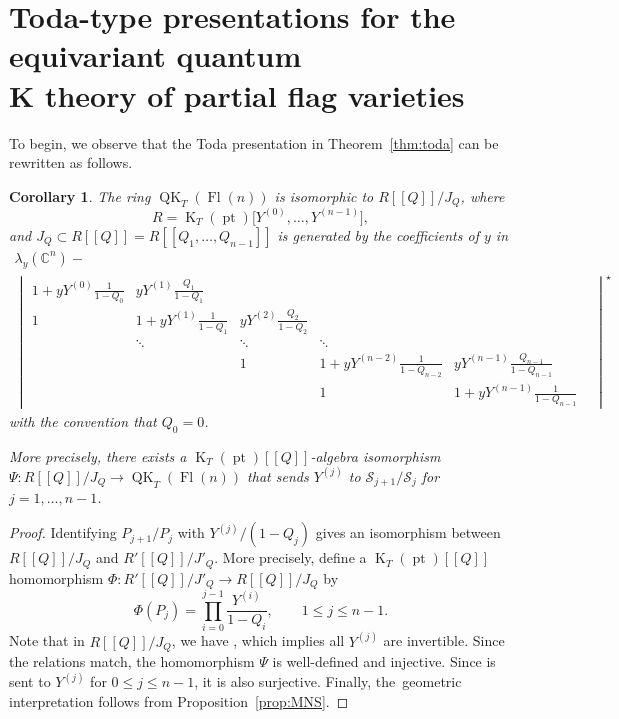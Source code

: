\documentclass[pdftex]{sigma}
\numberwithin{equation}{section}
\newtheorem{Corollary}[Theorem]{Corollary}
\theoremstyle{definition}
\newcommand{\dbb}[1]{[\![#1]\!]}
\DeclareMathOperator{\Fl}{Fl}
\DeclareMathOperator{\QK}{QK}
\DeclareMathOperator{\K}{K}
\DeclareMathOperator{\pt}{pt}
\newcommand{\C}{{\mathbb C}}
\newcommand{\cS}{{\mathcal S}}
\begin{document}
\section[Toda-type presentations for the equivariant quantum K theory of partial flag varieties]{Toda-type presentations for the equivariant quantum\\ K theory of partial flag varieties}%

To begin, we observe that the Toda presentation in Theorem~\ref{thm:toda} can be rewritten as follows.
\begin{Corollary}\label{cor:fln}
 The ring $\QK_T(\Fl(n))$ is isomorphic to $R\dbb{Q}/J_Q$, where
 \[
 R=\K_T(\pt)\bigl[Y^{(0)}, \dots, Y^{(n-1)}\bigr],
 \]
 and $J_Q\subset R\dbb{Q}=R\dbb{Q_1,\dots,Q_{n-1}}$ is generated by the coefficients of $y$ in
 \begin{gather*}%
 \lambda_y(\C^n) - \\
 \begin{vmatrix}
 1+yY^{(0)}\frac{1}{1-Q_0} & yY^{(1)}\frac{Q_1}{1-Q_1} & & & & \\[1mm]
 1 & 1+yY^{(1)}\frac{1}{1-Q_1} & yY^{(2)}\frac{Q_2}{1-Q_2} & & & \\ %
& \ddots & \ddots & \ddots \\ & & 1 & 1+yY^{(n-2)}\frac{1}{1-Q_{n-2}} & yY^{(n-1)}\frac{Q_{n-1}}{1-Q_{n-1}}\\[1mm] & & & 1 & 1+yY^{(n-1)}\frac{1}{1-Q_{n-1}}
\!\!\!\end{vmatrix}^\star
\end{gather*}
with the convention that $Q_0=0$.

More precisely,
there exists a $\K_T(\pt)[\![Q]\!]$-algebra isomorphism $\Psi\colon R[\![Q]\!]/J_Q \to \QK_T(\Fl(n))$ that sends $Y^{(j)}$ to $\cS_{j+1}/\cS_j$ for $j=1,\dots,n-1$.
\end{Corollary}
\begin{proof}
 Identifying $P_{j+1}/P_j$ with $Y^{(j)}/(1-Q_j)$ gives an isomorphism between $R[\![Q]\!]/J_Q$ and $R'[\![Q]\!]/J'_Q$. More precisely, define a $\K_T(\pt)[\![Q]\!]$ homomorphism $\Phi\colon R'[\![Q]\!]/J'_Q\to R[\![Q]\!]/J_Q$ by
\[
 \Phi(P_j)=\prod_{i=0}^{j-1}\frac{Y^{(i)}}{1-Q_i}, \qquad 1\leq j\leq n-1.
\]
Note that in $R[\![Q]\!]/J_Q$, we have \smash{$\det\C^{n}=\prod_{i=0}^{n-1}Y^{(i)}/(1-Q_i)$}, which implies all $Y^{(j)}$ are invertible. Since the relations match, the homomorphism $\Psi$ is well-defined and injective. Since  is sent to $Y^{(j)}$ for $0\leq j\leq n-1$, it is also surjective. Finally, the~geometric interpretation follows from Proposition~\ref{prop:MNS}.
\end{proof}
\end{document}
